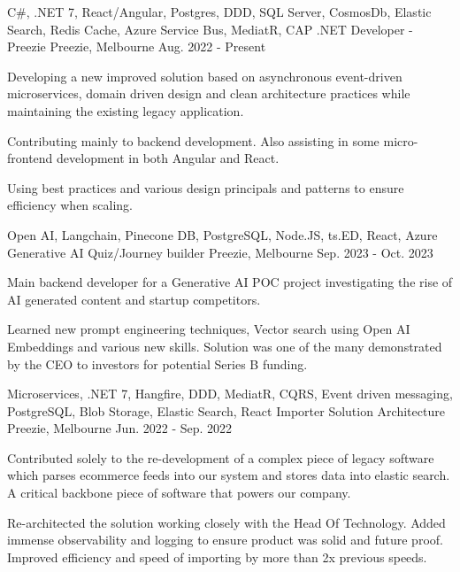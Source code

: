 

\vspace{-0.5\baselineskip}
\begin{cventries}
  \cventry
    {C\#, .NET 7, React/Angular, Postgres, DDD, SQL Server, CosmosDb, Elastic Search, Redis Cache, Azure Service Bus, MediatR, CAP}
    {.NET Developer - Preezie}
    {Preezie, Melbourne}
    {Aug. 2022 - Present}
    {
      \begin{cvitems}
        \item {Developing a new improved solution based on asynchronous event-driven microservices, domain driven design and clean architecture practices while maintaining the existing legacy application.}
        \item {Contributing mainly to backend development. Also assisting in some micro-frontend development in both Angular and React.}
        \item {Using best practices and various design principals and patterns to ensure efficiency when scaling.}
	  \end{cvitems}
    }
  \cventry
    {Open AI, Langchain, Pinecone DB, PostgreSQL, Node.JS, ts.ED, React, Azure}
    {Generative AI Quiz/Journey builder}
    {Preezie, Melbourne}
    {Sep. 2023 - Oct. 2023}
    {
      \begin{cvitems}
        \item {Main backend developer for a Generative AI POC project investigating the rise of AI generated content and startup competitors.}
        \item {Learned new prompt engineering techniques, Vector search using Open AI Embeddings and various new skills. Solution was one of the many demonstrated by the CEO to investors for potential Series B funding.}
      \end{cvitems}
    }
  \cventry
    {Microservices, .NET 7, Hangfire, DDD, MediatR, CQRS, Event driven messaging, PostgreSQL, Blob Storage, Elastic Search, React}
    {Importer Solution Architecture}
    {Preezie, Melbourne}
    {Jun. 2022 - Sep. 2022}
    {
      \begin{cvitems}
        \item {Contributed solely to the re-development of a complex piece of legacy software which parses ecommerce feeds into our system and stores data into elastic search. A critical backbone piece of software that powers our company.}
        \item {Re-architected the solution working closely with the Head Of Technology. Added immense observability and logging to ensure product was solid and future proof. Improved efficiency and speed of importing by more than 2x previous speeds.}

\end{cvitems}}
\end{cventries}
